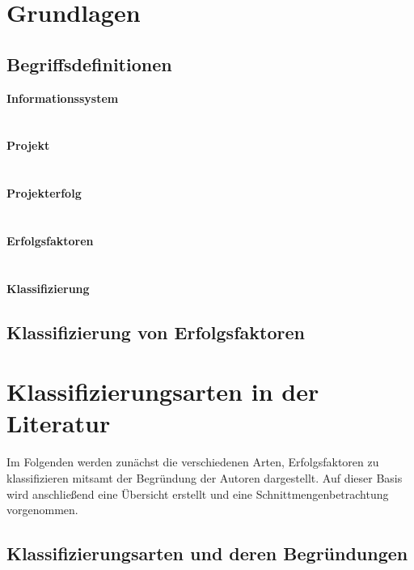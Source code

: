 \documentclass[12pt,a4paper,oneside]{article}
\newcommand{\EF}{Erfolgsfaktoren }
\begin{document}
\section{Grundlagen}
\subsection{Begriffsdefinitionen}

\textbf{Informationssystem}\\\noindent
\\
\\\noindent
\textbf{Projekt}\\\noindent
\\
\\\noindent
\textbf{Projekterfolg}\\\noindent
\\
\\\noindent
\textbf{Erfolgsfaktoren}\\\noindent
\\
\\\noindent
\textbf{Klassifizierung}\\\noindent


\subsection{Klassifizierung von \EF}


\clearpage
\section{Klassifizierungsarten in der Literatur}
Im Folgenden werden zunächst die verschiedenen Arten, Erfolgsfaktoren zu klassifizieren mitsamt der Begründung der Autoren dargestellt.
Auf dieser Basis wird anschließend eine Übersicht erstellt und eine Schnittmengenbetrachtung vorgenommen. 
\subsection{Klassifizierungsarten und deren Begründungen}



\end{document}
